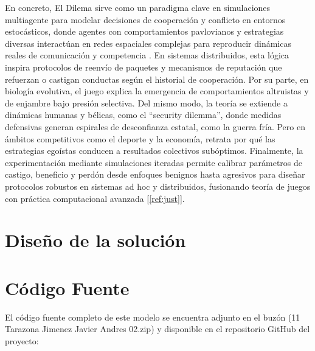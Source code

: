 \documentclass{article}
\begin{document}
En concreto, El Dilema sirve como un paradigma clave en simulaciones multiagente para modelar 
decisiones de cooperación y conflicto en entornos estocásticos, donde agentes con 
comportamientos pavlovianos y estrategias diversas interactúan en redes espaciales complejas 
para reproducir dinámicas reales de comunicación y competencia .
En sistemas distribuidos, esta lógica inspira protocolos de reenvío de paquetes y mecanismos de 
reputación que refuerzan o castigan conductas según el historial de cooperación.
Por su parte, en biología evolutiva, el juego explica la emergencia de comportamientos altruistas 
y de enjambre bajo presión selectiva.
Del mismo modo, la teoría se extiende a dinámicas humanas y bélicas, como el “security dilemma”, 
donde medidas defensivas generan espirales de desconfianza estatal, como la guerra fría. Pero
en ámbitos competitivos como el deporte y la economía, retrata por qué las estrategias 
egoístas conducen a resultados colectivos subóptimos. Finalmente, 
la experimentación mediante simulaciones iteradas permite calibrar parámetros de castigo, 
beneficio y perdón desde enfoques benignos hasta agresivos para diseñar protocolos robustos 
en sistemas ad hoc y distribuidos, fusionando teoría de juegos con práctica 
computacional avanzada [\ref{ref:just}].


\section{Diseño de la solución}\label{sec:dis}





\section{Código Fuente}\label{sec:cod}

El código fuente completo de este modelo se encuentra adjunto en el buzón 
(11 Tarazona Jimenez Javier Andres 02.zip)
y disponible en el repositorio GitHub del proyecto:
\end{document}
